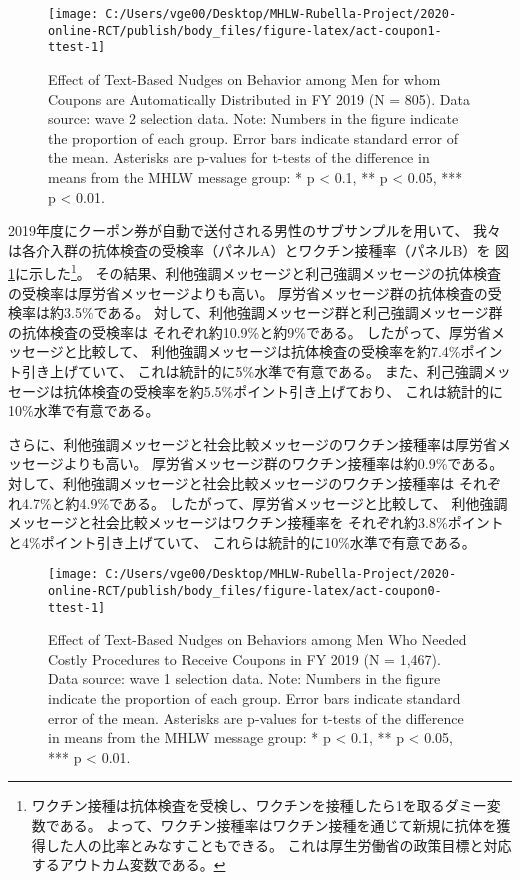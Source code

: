 \documentclass[
  11pt,
  a4paper,
]{article}
\begin{document}
\begin{figure}[t]
\texttt{[image: C:/Users/vge00/Desktop/MHLW-Rubella-Project/2020-online-RCT/publish/body\_files/figure-latex/act-coupon1-ttest-1]} \caption{Effect of Text-Based Nudges on Behavior among Men for whom Coupons are Automatically Distributed in FY 2019 (N = 805). Data source: wave 2 selection data. Note: Numbers in the figure indicate the proportion of each group. Error bars indicate standard error of the mean. Asterisks are p-values for t-tests of the difference in means from the MHLW message group: * p < 0.1, ** p < 0.05, *** p < 0.01.}\label{fig:act-coupon1-ttest}
\end{figure}

2019年度にクーポン券が自動で送付される男性のサブサンプルを用いて、
我々は各介入群の抗体検査の受検率（パネルA）とワクチン接種率（パネルB）を
図\ref{fig:act-coupon1-ttest}に示した\footnote{ワクチン接種は抗体検査を受検し、ワクチンを接種したら1を取るダミー変数である。
  よって、ワクチン接種率はワクチン接種を通じて新規に抗体を獲得した人の比率とみなすこともできる。
  これは厚生労働省の政策目標と対応するアウトカム変数である。}。
その結果、利他強調メッセージと利己強調メッセージの抗体検査の受検率は厚労省メッセージよりも高い。
厚労省メッセージ群の抗体検査の受検率は約3.5\%である。
対して、利他強調メッセージ群と利己強調メッセージ群の抗体検査の受検率は
それぞれ約10.9\%と約9\%である。
したがって、厚労省メッセージと比較して、
利他強調メッセージは抗体検査の受検率を約7.4\%ポイント引き上げていて、
これは統計的に5\%水準で有意である。
また、利己強調メッセージは抗体検査の受検率を約5.5\%ポイント引き上げており、
これは統計的に10\%水準で有意である。

さらに、利他強調メッセージと社会比較メッセージのワクチン接種率は厚労省メッセージよりも高い。
厚労省メッセージ群のワクチン接種率は約0.9\%である。
対して、利他強調メッセージと社会比較メッセージのワクチン接種率は
それぞれ4.7\%と約4.9\%である。
したがって、厚労省メッセージと比較して、
利他強調メッセージと社会比較メッセージはワクチン接種率を
それぞれ約3.8\%ポイントと4\%ポイント引き上げていて、
これらは統計的に10\%水準で有意である。

\begin{figure}[t]
\texttt{[image: C:/Users/vge00/Desktop/MHLW-Rubella-Project/2020-online-RCT/publish/body\_files/figure-latex/act-coupon0-ttest-1]} \caption{Effect of Text-Based Nudges on Behaviors among Men Who Needed Costly Procedures to Receive Coupons in FY 2019 (N = 1,467). Data source: wave 1 selection data. Note: Numbers in the figure indicate the proportion of each group. Error bars indicate standard error of the mean. Asterisks are p-values for t-tests of the difference in means from the MHLW message group: * p < 0.1, ** p < 0.05, *** p < 0.01.}\label{fig:act-coupon0-ttest}
\end{figure}
\end{document}
